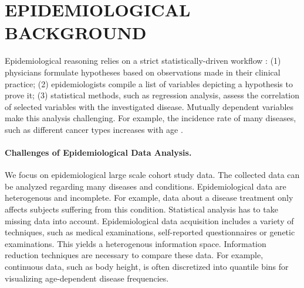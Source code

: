 \documentclass[a4paper,twoside]{style/article}
\begin{document}
\section{\uppercase{Epidemiological Background}}
\label{sec:EpidemiologicalBackground}
\noindent Epidemiological reasoning relies on a strict statistically-driven workflow \cite{Fletcher}:
(1) physicians formulate hypotheses based on observations made in their clinical practice; (2) epidemiologists compile a list of variables depicting a hypothesis to prove it; (3) statistical methods, such as regression analysis, assess the correlation of selected variables with the investigated disease.
Mutually dependent variables make this analysis challenging.
For example, the incidence rate of many diseases, such as different cancer types increases with age \cite{Fletcher}.
\paragraph{Challenges of Epidemiological Data Analysis.}
We focus on epidemiological large scale cohort study data.
The collected data can be analyzed regarding many diseases and conditions.
Epidemiological data are heterogenous and incomplete.
For example, data about a disease treatment only affects subjects suffering from this condition.
Statistical analysis has to take missing data into account.
Epidemiological data acquisition includes a variety of techniques, such as medical examinations, self-reported questionnaires or genetic examinations.
This yields a heterogenous information space.
Information reduction techniques are necessary to compare these data.
For example, continuous data, such as body height, is often discretized into quantile bins for visualizing age-dependent disease frequencies.
\end{document}
